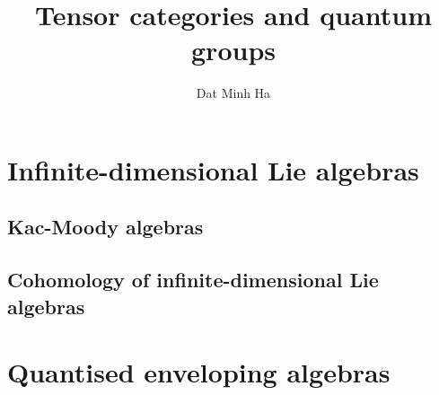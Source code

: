 

\setcounter{chapter}{-1}
\setcounter{section}{-1}





    \title{Tensor categories and quantum groups}
    
    \author{Dat Minh Ha}
    \maketitle
    
    \begin{abstract}
        
    \end{abstract}
    
    {
      \hypersetup{} 
      \dominitoc
      \tableofcontents %
      \listoftodos
    }
    
    

    \part{Infinite-dimensional Lie algebras}
        \chapter{Kac-Moody algebras}
            \begin{abstract}
            
            \end{abstract}
            
            \minitoc

            

            

        \chapter{Cohomology of infinite-dimensional Lie algebras}
            \begin{abstract}
            
            \end{abstract}
            
            \minitoc
    
    \part{Quantised enveloping algebras}
